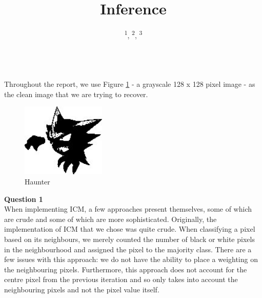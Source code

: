 \documentclass[10pt, a4paper, twocolumn]{article} %
\title{Inference} %
\author{
	\authorstyle{James O'Reilly\textsuperscript{1},  Adam Pluck\textsuperscript{2} and Jake Witter\textsuperscript{3}} %
	\newline\newline %
	\textsuperscript{1}\institution{35055},  %
	\textsuperscript{2}\institution{34013},  %
	\textsuperscript{3}\institution{35445}
}
\date{} %
\begin{document}
\maketitle %

\thispagestyle{firstpage} %

\\



\noindentThroughout Throughout the report, we use Figure \ref{fig:Haunter} - a grayscale 128 x 128 pixel image - as the clean image that we are trying to recover.

\begin{figure}[h]
    \centering
    \includegraphics[width = 4cm, scale= 0.2]{images/H.jpg}
    \caption{Haunter}
    \label{fig:Haunter}
\end{figure}

\noindent\textbf{Question 1}\\
When implementing ICM, a few approaches present themselves, some of which are crude and some of which are more sophisticated. Originally, the implementation of ICM that we chose was quite crude. When classifying a pixel based on its neighbours, we merely counted the number of black or white pixels in the neighbourhood and assigned the pixel to the majority class. There are a few issues with this approach: we do not have the ability to place a weighting on the neighbouring pixels. Furthermore, this approach does not account for the centre pixel from the previous iteration and so only takes into account the neighbouring pixels and not the pixel value itself.
\end{document}
